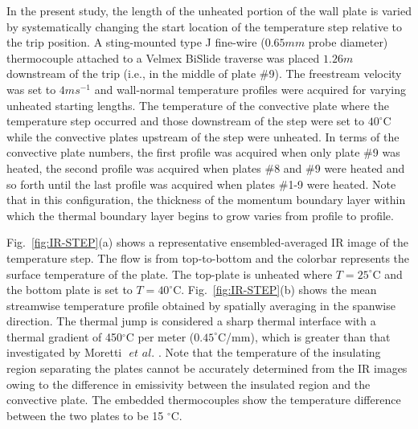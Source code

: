In the present study, the length of the unheated portion of the wall plate is varied by systematically changing the start location of the temperature step relative to the trip position. A sting-mounted type J fine-wire ($0.65mm$ probe diameter) thermocouple attached to a Velmex BiSlide traverse was placed $1.26m$ downstream of the trip (i.e., in the middle of plate $\#$9). The freestream velocity was set to $4ms^{-1}$ and wall-normal temperature profiles were acquired for varying unheated starting lengths. The temperature of the convective plate where the temperature step occurred and those downstream of the step were set to $40^\circ$C while the convective plates upstream of the step were unheated. In terms of the convective plate numbers, the first profile was acquired when only plate \#9 was heated, the second profile was acquired when plates \#8 and \#9 were heated and so forth until the last profile was acquired when plates \#1-9 were heated.  Note that in this configuration, the thickness of the momentum boundary layer within which the thermal boundary layer begins to grow varies from profile to profile. 

Fig.~\ref{fig:IR-STEP}(a) shows a representative ensembled-averaged IR image of the temperature step. The flow is from top-to-bottom and the colorbar represents the surface temperature of the plate. The top-plate is unheated where $T=25^\circ$C and the bottom plate is set to $T=40^\circ$C.  Fig.~\ref{fig:IR-STEP}(b) shows the mean streamwise temperature profile obtained by spatially averaging in the spanwise direction. The thermal jump is considered a sharp thermal interface with a thermal gradient of 450$^\circ$C per meter ($0.45^\circ$C/mm), which is greater than that investigated by Moretti $\textit{ et al.}$ \cite{Moretti1965}. Note that the temperature of the insulating region separating the plates cannot be accurately determined from the IR images owing to the difference in emissivity between the insulated region and the convective plate. The embedded thermocouples show the temperature difference between the two plates to be 15 $^\circ$C.  

